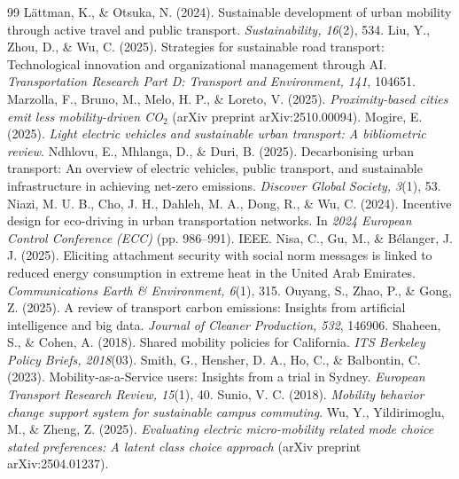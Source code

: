 \documentclass[11pt,a4paper]{article}
\begin{document}
\begin{thebibliography}{99}
 L\"attman, K., \& Otsuka, N. (2024). Sustainable
development of urban mobility through active travel and public transport. \emph{Sustainability,
16}(2), 534.
 Liu, Y., Zhou, D., \& Wu, C. (2025). Strategies for sustainable
road transport: Technological innovation and organizational management through AI.
\emph{Transportation Research Part D: Transport and Environment, 141}, 104651.
 Marzolla, F., Bruno, M., Melo, H. P., \& Loreto, V.
(2025). \emph{Proximity-based cities emit less mobility-driven CO$_2$} (arXiv preprint
arXiv:2510.00094).
 Mogire, E. (2025). \emph{Light electric vehicles and sustainable
urban transport: A bibliometric review}.
 Ndhlovu, E., Mhlanga, D., \& Duri, B. (2025).
Decarbonising urban transport: An overview of electric vehicles, public transport, and sustainable
infrastructure in achieving net-zero emissions. \emph{Discover Global Society, 3}(1), 53.
 Niazi, M. U. B., Cho, J. H., Dahleh, M. A., Dong, R., \& Wu,
C. (2024). Incentive design for eco-driving in urban transportation networks. In \emph{2024 European
Control Conference (ECC)} (pp. 986--991). IEEE.
 Nisa, C., Gu, M., \& B\'elanger, J. J. (2025). Eliciting
attachment security with social norm messages is linked to reduced energy consumption in extreme heat
in the United Arab Emirates. \emph{Communications Earth \& Environment, 6}(1), 315.
 Ouyang, S., Zhao, P., \& Gong, Z. (2025). A review of
transport carbon emissions: Insights from artificial intelligence and big data. \emph{Journal of
Cleaner Production, 532}, 146906.
 Shaheen, S., \& Cohen, A. (2018). Shared mobility
policies for California. \emph{ITS Berkeley Policy Briefs, 2018}(03).
 Smith, G., Hensher, D. A., Ho, C., \& Balbontin, C. (2023).
Mobility-as-a-Service users: Insights from a trial in Sydney. \emph{European Transport Research
Review, 15}(1), 40.
 Sunio, V. C. (2018). \emph{Mobility behavior change support system
for sustainable campus commuting}.
 Wu, Y., Yildirimoglu, M., \& Zheng, Z. (2025). \emph{Evaluating
electric micro-mobility related mode choice stated preferences: A latent class choice approach}
(arXiv preprint arXiv:2504.01237).
\end{thebibliography}
\end{document}

